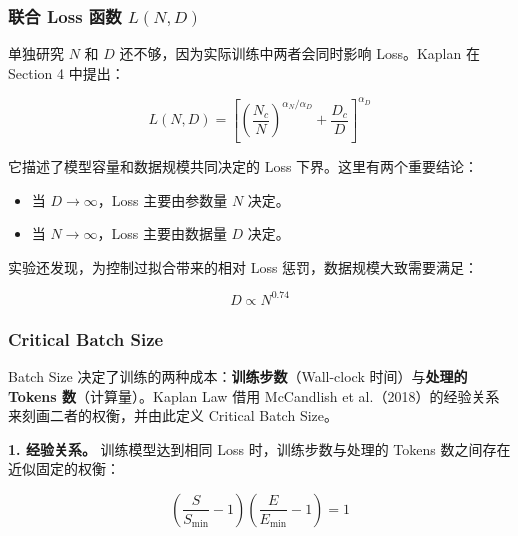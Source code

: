 \documentclass[
  11pt,
  a4paper,
  fontset=none]{ctexart}
\providecommand{\tightlist}{%
  \setlength{\itemsep}{0pt}\setlength{\parskip}{0pt}}
\newenvironment{NotesFormula}{%
  \par\noindent\begin{minipage}{\linewidth}%
  \setlength{\parindent}{2em}%
  \setlength{\parskip}{0.35em}%
}{\end{minipage}\par}
\begin{document}
\subsubsection{\texorpdfstring{联合 Loss 函数
\(L(N,D)\)}{联合 Loss 函数 L(N,D)}}\label{ux8054ux5408-loss-ux51fdux6570-lnd}

\begin{NotesFormula}

单独研究 \(N\) 和 \(D\) 还不够，因为实际训练中两者会同时影响
Loss。Kaplan 在 Section 4 中提出：

\[\boxed{L(N,D)=\left[\left(\frac{N_c}{N}\right)^{\alpha_N/\alpha_D}+\frac{D_c}{D}\right]^{\alpha_D}}\]

\end{NotesFormula}

它描述了模型容量和数据规模共同决定的 Loss 下界。这里有两个重要结论：

\begin{itemize}
\tightlist
\item
  当 \(D\to\infty\)，Loss 主要由参数量 \(N\) 决定。
\item
  当 \(N\to\infty\)，Loss 主要由数据量 \(D\) 决定。
\end{itemize}

\begin{NotesFormula}

实验还发现，为控制过拟合带来的相对 Loss 惩罚，数据规模大致需要满足：

\[D\propto N^{0.74}\]

\end{NotesFormula}

\subsubsection{Critical Batch Size}\label{critical-batch-size}

Batch Size 决定了训练的两种成本：\textbf{训练步数}（Wall-clock
时间）与\textbf{处理的 Tokens 数}（计算量）。Kaplan Law 借用 McCandlish
et al.（2018）的经验关系来刻画二者的权衡，并由此定义 Critical Batch
Size。

\begin{NotesFormula}

\textbf{1. 经验关系。} 训练模型达到相同 Loss 时，训练步数与处理的 Tokens
数之间存在近似固定的权衡：

\[\boxed{\left(\frac{S}{S_{\min}}-1\right)\left(\frac{E}{E_{\min}}-1\right)=1}\]

\end{NotesFormula}
\end{document}
